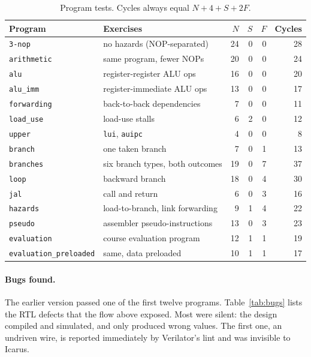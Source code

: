 \documentclass[12pt]{article}
\begin{document}
\begin{table}[ht]
\centering
\caption{Program tests. Cycles always equal $N + 4 + S + 2F$.}
\label{tab:programs}
\small
\begin{tabular}{llrrrr}
\toprule
Program & Exercises & $N$ & $S$ & $F$ & Cycles \\
\midrule
\texttt{3-nop}       & no hazards (NOP-separated)        & 24 & 0 & 0 & 28 \\
\texttt{arithmetic}  & same program, fewer NOPs          & 20 & 0 & 0 & 24 \\
\texttt{alu}         & register-register ALU ops         & 16 & 0 & 0 & 20 \\
\texttt{alu\_imm}    & register-immediate ALU ops        & 13 & 0 & 0 & 17 \\
\texttt{forwarding}  & back-to-back dependencies         &  7 & 0 & 0 & 11 \\
\texttt{load\_use}   & load-use stalls                   &  6 & 2 & 0 & 12 \\
\texttt{upper}       & \texttt{lui}, \texttt{auipc}      &  4 & 0 & 0 &  8 \\
\texttt{branch}      & one taken branch                  &  7 & 0 & 1 & 13 \\
\texttt{branches}    & six branch types, both outcomes   & 19 & 0 & 7 & 37 \\
\texttt{loop}        & backward branch                   & 18 & 0 & 4 & 30 \\
\texttt{jal}         & call and return                   &  6 & 0 & 3 & 16 \\
\texttt{hazards}     & load-to-branch, link forwarding   &  9 & 1 & 4 & 22 \\
\texttt{pseudo}      & assembler pseudo-instructions     & 13 & 0 & 3 & 23 \\
\texttt{evaluation}  & course evaluation program         & 12 & 1 & 1 & 19 \\
\texttt{evaluation\_preloaded} & same, data preloaded    & 10 & 1 & 1 & 17 \\
\bottomrule
\end{tabular}
\end{table}

\paragraph{Bugs found.}
The earlier version passed one of the first twelve programs. Table~\ref{tab:bugs}
lists the RTL defects that the flow above exposed. Most were silent: the design
compiled and simulated, and only produced wrong values. The first one, an
undriven wire, is reported immediately by Verilator's lint and was invisible to
Icarus.
\end{document}
